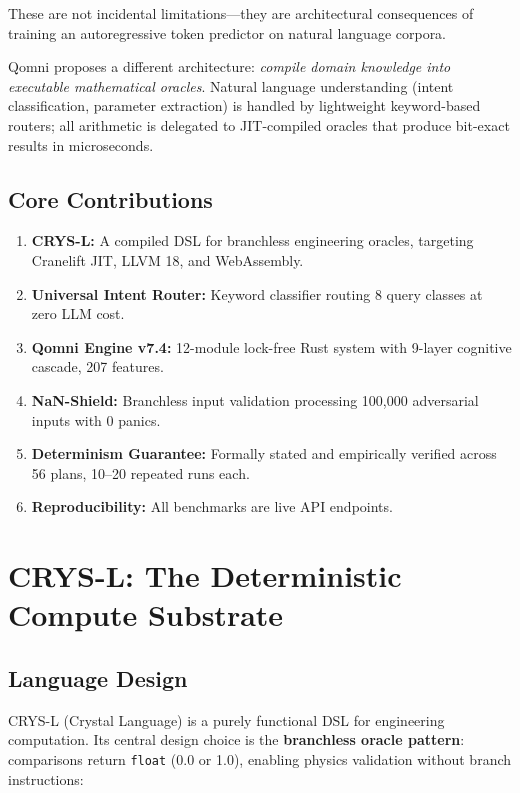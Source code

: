\documentclass[11pt]{article}
\begin{document}
These are not incidental limitations---they are architectural consequences of
training an autoregressive token predictor on natural language corpora.

Qomni proposes a different architecture: \emph{compile domain knowledge into
executable mathematical oracles}. Natural language understanding (intent
classification, parameter extraction) is handled by lightweight keyword-based
routers; all arithmetic is delegated to JIT-compiled oracles that produce
bit-exact results in microseconds.

\subsection{Core Contributions}

\begin{enumerate}
\item \textbf{CRYS-L:} A compiled DSL for branchless engineering oracles,
      targeting Cranelift JIT, LLVM 18, and WebAssembly.
\item \textbf{Universal Intent Router:} Keyword classifier routing 8 query
      classes at zero LLM cost.
\item \textbf{Qomni Engine v7.4:} 12-module lock-free Rust system with
      9-layer cognitive cascade, 207 features.
\item \textbf{NaN-Shield:} Branchless input validation processing 100,000
      adversarial inputs with 0 panics.
\item \textbf{Determinism Guarantee:} Formally stated and empirically verified
      across 56 plans, 10--20 repeated runs each.
\item \textbf{Reproducibility:} All benchmarks are live API endpoints.
\end{enumerate}

\section{CRYS-L: The Deterministic Compute Substrate}

\subsection{Language Design}

CRYS-L (Crystal Language) is a purely functional DSL for engineering computation.
Its central design choice is the \textbf{branchless oracle pattern}:
comparisons return \texttt{float} (0.0 or 1.0), enabling physics validation
without branch instructions:
\end{document}
